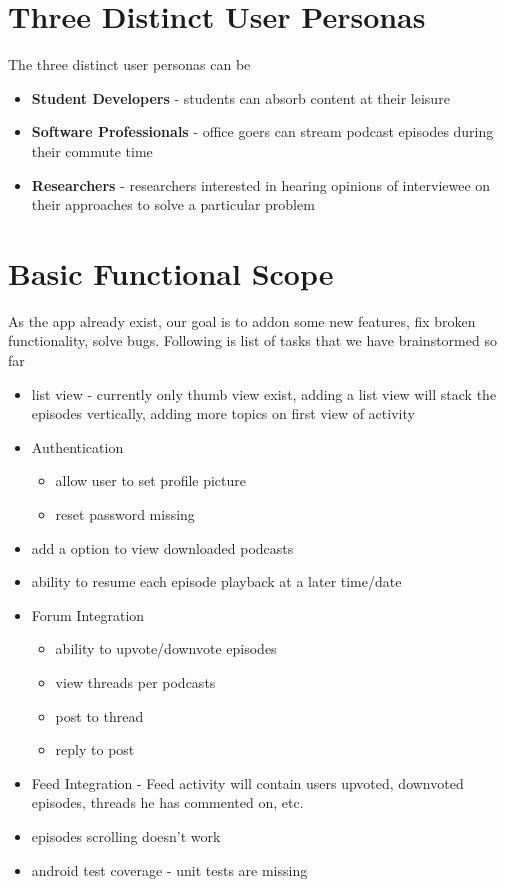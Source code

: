 \documentclass{article}
\begin{document}
\section{Three Distinct User Personas}
The three distinct user personas can be
\begin{itemize}
  \item \textbf{Student Developers} - students can absorb content at their leisure
  \item \textbf{Software Professionals} - office goers can stream podcast episodes during their commute time
  \item \textbf{Researchers} - researchers interested in hearing opinions of interviewee on their approaches to solve a particular problem
\end{itemize}


\section{Basic Functional Scope}
As the app already exist, our goal is to addon some new features, fix broken functionality, solve bugs.
Following is list of tasks that we have brainstormed so far

\begin{itemize}
  \item list view - currently only thumb view exist, adding a list view will stack the episodes vertically, adding more topics on first view of activity
  \item Authentication 
    \begin{itemize}
      \item allow user to set profile picture
      \item reset password missing
    \end{itemize}
  \item add a option to view downloaded podcasts
  \item ability to resume each episode playback at a later time/date
  \item Forum Integration
    \begin{itemize}
    \item ability to upvote/downvote episodes
    \item  view threads per podcasts
    \item post to thread
    \item reply to post
    \end{itemize}
  \item Feed Integration - Feed activity will contain users upvoted, downvoted episodes, threads he has commented on, etc.
  \item episodes scrolling doesn't work
  \item android test coverage - unit tests are missing
\end{itemize}
\end{document}
